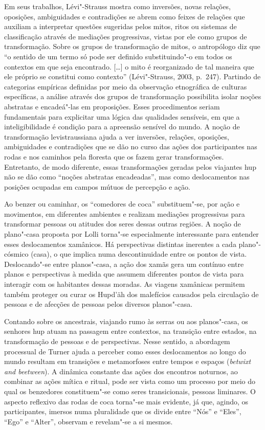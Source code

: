 Em seus trabalhos, Lévi"-Strauss mostra como inversões, novas relações,
oposições, ambiguidades e contradições se abrem como feixes de relações
que auxiliam a interpretar questões sugeridas pelos mitos, ritos ou
sistemas de classificação através de mediações progressivas, vistas por
ele como grupos de transformação. Sobre os grupos de transformação de
mitos, o antropólogo diz que ``o sentido de um termo só pode ser
definido substituindo"-o em todos os contextos em que seja encontrado.
{[}\ldots{}{]} o mito é reorganizado de tal maneira que ele próprio se
constitui como contexto'' (Lévi"-Strauss, 2003, p.~247). Partindo de
categorias empíricas definidas por meio da observação etnográfica de
culturas específicas, a análise através dos grupos de transformação
possibilita isolar noções abstratas e encadeá"-las em proposições. Esses
procedimentos seriam fundamentais para explicitar uma lógica das
qualidades sensíveis, em que a inteligibilidade é condição para a
apreensão sensível do mundo. A noção de transformação levistraussiana
ajuda a ver inversões, relações, oposições, ambiguidades e contradições
que se dão no curso das ações dos participantes nas rodas e nos caminhos
pela floresta que os fazem gerar transformações. Entretanto, de modo
diferente, essas transformações geradas pelos viajantes hup não se dão
como ``noções abstratas encadeadas'', mas como deslocamentos nas
posições ocupadas em campos mútuos de percepção e ação.

Ao benzer ou caminhar, os ``comedores de coca'' substituem"-se, por ação
e movimentos, em diferentes ambientes e realizam mediações progressivas
para transformar pessoas ou atitudes dos seres dessas outras regiões. A
noção de plano"-casa proposta por Lolli torna"-se especialmente
interessante para entender esses deslocamentos xamânicos. Há
perspectivas distintas inerentes a cada plano"-cósmico (casa), o que
implica numa descontinuidade entre os pontos de vista. Deslocando"-se
entre planos"-casa, a ação dos xamãs gera um contínuo entre planos e
perspectivas à medida que assumem diferentes pontos de vista para
interagir com os habitantes dessas moradas. As viagens xamânicas
permitem também proteger ou curar os Hupd'äh dos malefícios causados
pela circulação de pessoas e de afecções de pessoas pelos diversos
planos"-casa.

Contando sobre os ancestrais, viajando rumo às serras ou aos
planos"-casa, os senhores hup atuam na passagem entre contextos, na
transição entre estados, na transformação de pessoas e de perspectivas.
Nesse sentido, a abordagem processual de Turner ajuda a perceber como
esses deslocamentos ao longo do mundo resultam em transições e
metamorfoses entre tempos e espaços (\textit{betwixt and beetween}). A
dinâmica constante das ações dos encontros noturnos, ao combinar as
ações mítica e ritual, pode ser vista como um processo por meio do qual
os benzedores constituem"-se como seres transicionais, pessoas liminares.
O aspecto reflexivo das rodas de coca torna"-se mais evidente, já que,
agindo, os participantes, imersos numa pluralidade que os divide entre
``Nós'' e ``Eles'', ``Ego'' e ``Alter'', observam e revelam"-se a si
mesmos.

